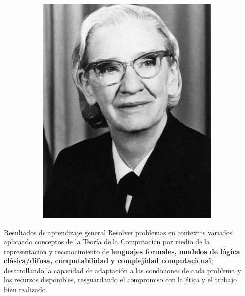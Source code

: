 \documentclass{beamer}
\begin{document}
{\begin{figure}
\begin{subfigure}{0.24\textwidth}
        \includegraphics[width=\linewidth]{images/grace_hopper.jpg}
    \end{subfigure}
  \end{figure}
}

\frame{\titlepage}

\begin{frame}{Resultados de aprendizaje general}
  Resolver problemas en contextos variados aplicando conceptos de la Teoría de
  la Computación por medio de la representación y reconocimiento de
  \textbf{lenguajes formales, modelos de lógica clásica/difusa, computabilidad y
    complejidad computacional}; desarrollando la capacidad de adaptación a las
  condiciones de cada problema y los recursos disponibles, resguardando el
  compromiso con la ética y el trabajo bien realizado.
\end{frame}
\end{document}
